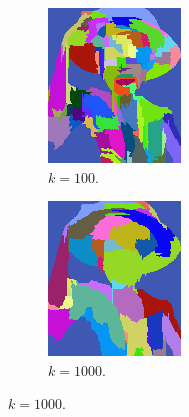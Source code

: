 \documentclass{beamer}
\begin{document}
\begin{frame}
\begin{figure}[htb!]
\begin{subfigure}{.3\textwidth}
\includegraphics[width=\textwidth]{../images/luffyK100.png}
\caption{$k = 100$.}
\label{fig:smallKSegmentation}
\end{subfigure}
\begin{subfigure}{.3\textwidth}
\includegraphics[width=\textwidth]{../images/luffyK1000.png}
\caption{$k = 1000$.}
\label{fig:largeKSegmentation}
\end{subfigure}
\end{figure}


\end{frame}
\end{document}

